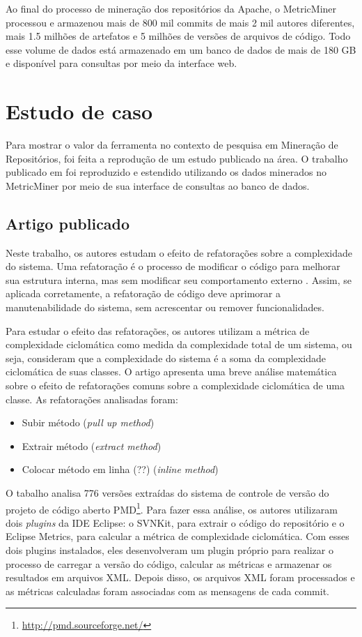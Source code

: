 \documentclass[a4paper, 12pt, twoside]{book}
\begin{document}
        Ao final do processo de mineração dos repositórios da Apache, o MetricMiner processou e armazenou mais de 800 mil commits de mais 2 mil autores diferentes, mais 1.5 milhões de artefatos e 5 milhões de versões de arquivos de código. Todo esse volume de dados está armazenado em um banco de dados de mais de 180 GB e disponível para consultas por meio da interface web.

    \section{Estudo de caso} \label{sc:estudo-caso}
        Para mostrar o valor da ferramenta no contexto de pesquisa em Mineração de Repositórios, foi feita a reprodução de um estudo publicado na área. O trabalho publicado em \cite{SoetensQUATIC2010} foi reproduzido e estendido utilizando os dados minerados no MetricMiner por meio de sua interface de consultas ao banco de dados.

        \subsection*{Artigo publicado}

        Neste trabalho, os autores estudam o efeito de refatorações sobre a complexidade do sistema. Uma refatoração é o processo de modificar o código para melhorar sua estrutura interna, mas sem modificar seu comportamento externo \cite{fowler-refactoring}. Assim, se aplicada corretamente, a refatoração de código deve aprimorar a manutenabilidade do sistema, sem acrescentar ou remover funcionalidades.

        Para estudar o efeito das refatorações, os autores utilizam a métrica de complexidade ciclomática como medida da complexidade total de um sistema, ou seja, consideram que a complexidade do sistema é a soma da complexidade ciclomática de suas classes. O artigo apresenta uma breve análise matemática sobre o efeito de refatorações comuns sobre a complexidade ciclomática de uma classe. As refatorações analisadas foram: 
        \begin{itemize}
            \item Subir método (\textit{pull up method})
            \item Extrair método (\textit{extract method})
            \item Colocar método em linha (??) (\textit{inline method})
        \end{itemize}

        O tabalho analisa 776 versões extraídas do sistema de controle de versão do projeto de código aberto PMD\footnote{\url{http://pmd.sourceforge.net/}}. Para fazer essa análise, os autores utilizaram dois \textit{plugins} da IDE Eclipse: o SVNKit, para extrair o código do repositório e o Eclipse Metrics, para calcular a métrica de complexidade ciclomática. Com esses dois plugins instalados, eles desenvolveram um plugin próprio para realizar o processo de carregar a versão do código, calcular as métricas e armazenar os resultados em arquivos XML. Depois disso, os arquivos XML foram processados e as métricas calculadas foram associadas com as mensagens de cada commit.
\end{document}
